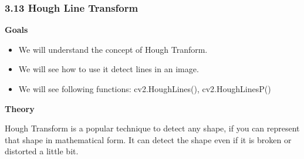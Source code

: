 \documentclass[11pt]{article}
\begin{document}
    \subsubsection{3.13 Hough Line Transform}\label{hough-line-transform}

\textbf{Goals}

\begin{itemize}
\item
  We will understand the concept of Hough Tranform.
\item
  We will see how to use it detect lines in an image.
\item
  We will see following functions: cv2.HoughLines(), cv2.HoughLinesP()
\end{itemize}

\textbf{Theory}

Hough Transform is a popular technique to detect any shape, if you can
represent that shape in mathematical form. It can detect the shape even
if it is broken or distorted a little bit.
\end{document}
